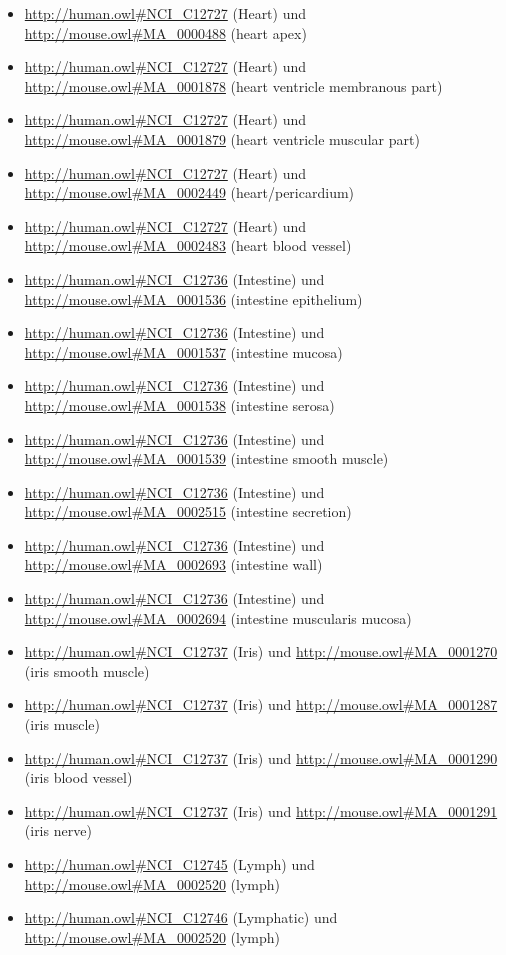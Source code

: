 \begin{itemize}
	\item \url{http://human.owl#NCI_C12727} (Heart) und \url{http://mouse.owl#MA_0000488} (heart apex)
	\item \url{http://human.owl#NCI_C12727} (Heart) und \url{http://mouse.owl#MA_0001878} (heart ventricle membranous part)
	\item \url{http://human.owl#NCI_C12727} (Heart) und \url{http://mouse.owl#MA_0001879} (heart ventricle muscular part)
	\item \url{http://human.owl#NCI_C12727} (Heart) und \url{http://mouse.owl#MA_0002449} (heart/pericardium)
	\item \url{http://human.owl#NCI_C12727} (Heart) und \url{http://mouse.owl#MA_0002483} (heart blood vessel)
	\item \url{http://human.owl#NCI_C12736} (Intestine) und \url{http://mouse.owl#MA_0001536} (intestine epithelium)
	\item \url{http://human.owl#NCI_C12736} (Intestine) und \url{http://mouse.owl#MA_0001537} (intestine mucosa)
	\item \url{http://human.owl#NCI_C12736} (Intestine) und \url{http://mouse.owl#MA_0001538} (intestine serosa)
	\item \url{http://human.owl#NCI_C12736} (Intestine) und \url{http://mouse.owl#MA_0001539} (intestine smooth muscle)
	\item \url{http://human.owl#NCI_C12736} (Intestine) und \url{http://mouse.owl#MA_0002515} (intestine secretion)
	\item \url{http://human.owl#NCI_C12736} (Intestine) und \url{http://mouse.owl#MA_0002693} (intestine wall)
	\item \url{http://human.owl#NCI_C12736} (Intestine) und \url{http://mouse.owl#MA_0002694} (intestine muscularis mucosa)
	\item \url{http://human.owl#NCI_C12737} (Iris) und \url{http://mouse.owl#MA_0001270} (iris smooth muscle)
	\item \url{http://human.owl#NCI_C12737} (Iris) und \url{http://mouse.owl#MA_0001287} (iris muscle)
	\item \url{http://human.owl#NCI_C12737} (Iris) und \url{http://mouse.owl#MA_0001290} (iris blood vessel)
	\item \url{http://human.owl#NCI_C12737} (Iris) und \url{http://mouse.owl#MA_0001291} (iris nerve)
	\item \url{http://human.owl#NCI_C12745} (Lymph\textunderscoreNode) und \url{http://mouse.owl#MA_0002520} (lymph)
	\item \url{http://human.owl#NCI_C12746} (Lymphatic\textunderscoreSystem) und \url{http://mouse.owl#MA_0002520} (lymph)

\end{itemize}
